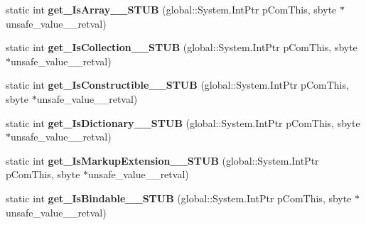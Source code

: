 \begin{DoxyCompactItemize}
static int {\bfseries get\+\_\+\+Is\+Array\+\_\+\+\_\+\+S\+T\+UB} (global\+::\+System.\+Int\+Ptr p\+Com\+This, sbyte $\ast$unsafe\+\_\+value\+\_\+\+\_\+retval)
\item 
\mbox{\label{struct_windows_1_1_u_i_1_1_xaml_1_1_markup_1_1_i_xaml_type_____impl_1_1_vtbl_a1baa441a23c37611c49b850c74fbf051}} 
static int {\bfseries get\+\_\+\+Is\+Collection\+\_\+\+\_\+\+S\+T\+UB} (global\+::\+System.\+Int\+Ptr p\+Com\+This, sbyte $\ast$unsafe\+\_\+value\+\_\+\+\_\+retval)
\item 
\mbox{\label{struct_windows_1_1_u_i_1_1_xaml_1_1_markup_1_1_i_xaml_type_____impl_1_1_vtbl_a42a944d99e96c49c14985643ca16006c}} 
static int {\bfseries get\+\_\+\+Is\+Constructible\+\_\+\+\_\+\+S\+T\+UB} (global\+::\+System.\+Int\+Ptr p\+Com\+This, sbyte $\ast$unsafe\+\_\+value\+\_\+\+\_\+retval)
\item 
\mbox{\label{struct_windows_1_1_u_i_1_1_xaml_1_1_markup_1_1_i_xaml_type_____impl_1_1_vtbl_ae4a7077f691827099102d01d8f220dfa}} 
static int {\bfseries get\+\_\+\+Is\+Dictionary\+\_\+\+\_\+\+S\+T\+UB} (global\+::\+System.\+Int\+Ptr p\+Com\+This, sbyte $\ast$unsafe\+\_\+value\+\_\+\+\_\+retval)
\item 
\mbox{\label{struct_windows_1_1_u_i_1_1_xaml_1_1_markup_1_1_i_xaml_type_____impl_1_1_vtbl_a3cbe850aa2e44e7e329ed55cadaf46c4}} 
static int {\bfseries get\+\_\+\+Is\+Markup\+Extension\+\_\+\+\_\+\+S\+T\+UB} (global\+::\+System.\+Int\+Ptr p\+Com\+This, sbyte $\ast$unsafe\+\_\+value\+\_\+\+\_\+retval)
\item 
\mbox{\label{struct_windows_1_1_u_i_1_1_xaml_1_1_markup_1_1_i_xaml_type_____impl_1_1_vtbl_a16746d434311e29db3b82b909646abfd}} 
static int {\bfseries get\+\_\+\+Is\+Bindable\+\_\+\+\_\+\+S\+T\+UB} (global\+::\+System.\+Int\+Ptr p\+Com\+This, sbyte $\ast$unsafe\+\_\+value\+\_\+\+\_\+retval)
\item 
\mbox{\label{struct_windows_1_1_u_i_1_1_xaml_1_1_markup_1_1_i_xaml_type_____impl_1_1_vtbl_a05c536ae8ea8396f03ba8390e731e8d0}} 

\end{DoxyCompactItemize}
